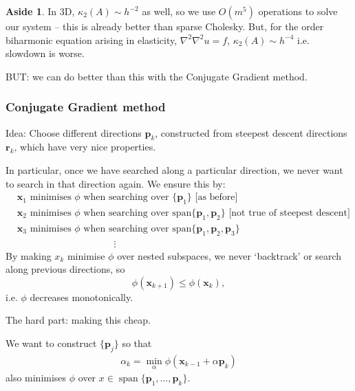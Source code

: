 \documentclass[12pt, a4paper]{article}
\renewcommand{\vec}[1]{\mathbf{#1}}
\theoremstyle{definition}
\newtheorem*{aside}{Aside}
\theoremstyle{remark}
\numberwithin{equation}{section}
\begin{document}
\begin{aside}
In 3D, $\kappa_2(A) \sim h^{-2}$ as well, so we use $O(m^5)$ operations to solve our system -- this is already better than sparse Cholesky. But, for the  order biharmonic equation arising in elasticity, $\nabla^2\nabla^2u=f$, $\kappa_2(A) \sim h^{-4}$ i.e. slowdown is worse. 
\end{aside}

BUT: we can do better than this with the Conjugate Gradient method.

\newpage
\subsubsection{Conjugate Gradient method}
Idea: Choose different directions $\vec{p}_k$, constructed from steepest descent directions $\vec{r}_k$, which have very nice properties.

In particular, once we have searched along a particular direction, we never want to search in that direction again.
We ensure this by:
\begin{align*}
&\mbox{$\vec{x}_1$ minimises $\phi$ when searching over $\{\vec{p}_1\}$ [as before]}\\
&\mbox{$\vec{x}_2$ minimises $\phi$ when searching over span$\{\vec{p}_1,\vec{p}_2\}$} \mbox{ [not true of steepest descent]} \\
&\mbox{$\vec{x}_3$ minimises $\phi$ when searching over span$\{\vec{p}_1,\vec{p}_2,\vec{p}_3\}$}\\
&\phantom{asdfasdfasfdasdasdsd}\vdots
\end{align*}
By making $x_k$ minimise $\phi$ over nested subspaces, 
we never `backtrack' or search along previous directions, so 
\[\phi(\vec{x}_{k+1}) \le \phi(\vec{x}_k),\]
i.e. $\phi$ decreases monotonically.

The hard part: making this cheap.

We want to construct $\{\vec{p}_j\}$ so that
\begin{align*}
\alpha_k =\min_\alpha \phi(\vec{x}_{k-1}+\alpha \vec{p}_k)
\end{align*}
 also minimises $\phi$ over $x \in \operatorname{span}\{\vec{p}_1,\ldots,\vec{p}_k\}$.

%
\end{document}
